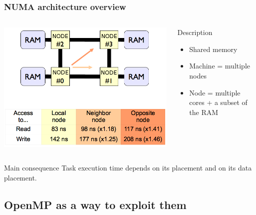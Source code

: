\documentclass[xcolor={usenames,dvipsnames,svgnames,table}, aspectratio=43]{beamer}
\begin{document}
\begin{frame}
\frametitle{NUMA architecture overview}
\begin{columns}[T,onlytextwidth]
  \includegraphics[scale=0.3]{graph/NUMA-latences}

  \begin{block}{Description}
    \begin{itemize}
      \item Shared memory
      \item Machine = multiple nodes
      \item Node = multiple cores + a subset of the RAM
    \end{itemize}
  \end{block}

\end{columns}
\begin{alertblock}{Main consequence}
  Task execution time depends on its placement and on its data placement.
\end{alertblock}

\end{frame}

\subsection{OpenMP as a way to exploit them}
\end{document}
